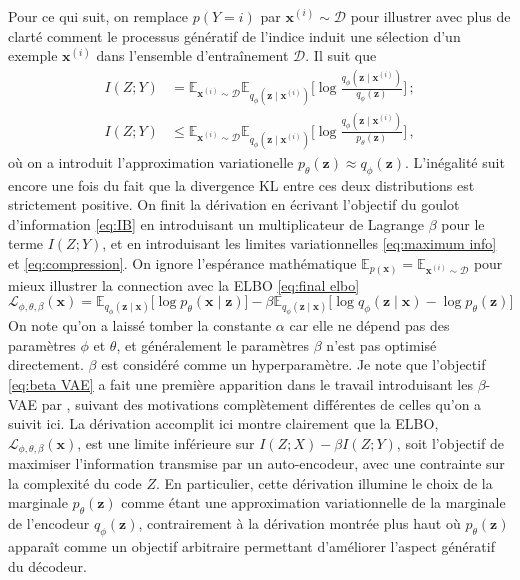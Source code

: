Pour ce qui suit, on remplace $p(Y=i)$ par $\mathbf{x}^{(i)} \sim \mathcal{D}$ pour illustrer avec plus de clarté 
comment le processus génératif de l'indice induit une sélection d'un exemple $\mathbf{x}^{(i)}$ dans l'ensemble 
d'entraînement $\mathcal{D}$. Il suit que 
\begin{align}
        I(Z; Y) &= \mathbb{E}_{\mathbf{x}^{(i)} \sim \mathcal{D}} \mathbb{E}_{q_\phi(\mathbf{z} \mid \mathbf{x}^{(i)})} \bigg[ 
                \log \frac{q_\phi(\mathbf{z} \mid \mathbf{x}^{(i)}) }{q_\phi (\mathbf{z})}        
        \bigg]\, ; \\[1.5ex]
        \label{eq:compression}
        I(Z; Y) &\leq \mathbb{E}_{\mathbf{x}^{(i)} \sim \mathcal{D}} \mathbb{E}_{q_\phi(\mathbf{z} \mid \mathbf{x}^{(i)})} \bigg[ 
                \log \frac{q_\phi(\mathbf{z} \mid \mathbf{x}^{(i)}) }{p_\theta (\mathbf{z})}        
        \bigg]\, , 
\end{align}
où on a introduit l'approximation variationelle $p_\theta(\mathbf{z}) \approx q_\phi(\mathbf{z})$. 
L'inégalité suit encore une fois 
du fait que la divergence KL entre ces deux distributions est strictement positive.
On finit la dérivation en écrivant l'objectif du goulot d'information \eqref{eq:IB} en introduisant un multiplicateur 
de Lagrange $\beta$ pour le terme $I(Z; Y)$, et en introduisant 
les limites variationnelles \eqref{eq:maximum info} et \eqref{eq:compression}. On ignore  
l'espérance mathématique $\mathbb{E}_{p(\mathbf{x})} = \mathbb{E}_{\mathbf{x}^{(i)} \sim \mathcal{D}}$ pour mieux illustrer la connection 
avec la ELBO \eqref{eq:final elbo}
\begin{equation}\label{eq:beta VAE}
        \mathcal{L}_{\phi,\theta,\beta}(\mathbf{x}) =  \mathbb{E}_{q_\phi(\mathbf{z} \mid \mathbf{x})} \bigg[\log p_\theta (\mathbf{x} \mid \mathbf{z})\bigg]
        -  \beta  \mathbb{E}_{q_\phi(\mathbf{z} \mid \mathbf{x})} \bigg[ 
                \log q_\phi(\mathbf{z} \mid \mathbf{x})        
                -\log p_\theta(\mathbf{z})
                \bigg]
\end{equation} 
On note qu'on a laissé tomber la constante $\alpha$ car elle ne dépend pas des paramètres $\phi$ et $\theta$, et généralement le paramètres $\beta$ 
n'est pas optimisé directement. $\beta$ est considéré comme un hyperparamètre. 
Je note que l'objectif \eqref{eq:beta VAE} a fait une première apparition dans le travail introduisant les $\beta$-VAE par \citet{Higgins2017}, 
suivant des motivations complètement différentes de celles qu'on a suivit ici. La dérivation accomplit ici 
montre clairement que la ELBO, $\mathcal{L}_{\phi,\theta,\beta}(\mathbf{x})$, est une limite inférieure 
sur $I(Z; X) - \beta I(Z; Y)$, soit l'objectif de maximiser l'information transmise par un auto-encodeur, avec une 
contrainte sur la complexité du code $Z$. En particulier, cette dérivation illumine le choix de la marginale $p_\theta(\mathbf{z})$ 
comme étant une approximation variationnelle de la marginale de l'encodeur $q_\phi(\mathbf{z})$, contrairement à la dérivation 
montrée plus haut où $p_\theta(\mathbf{z})$ apparaît comme un objectif arbitraire permettant d'améliorer l'aspect 
génératif du décodeur.

